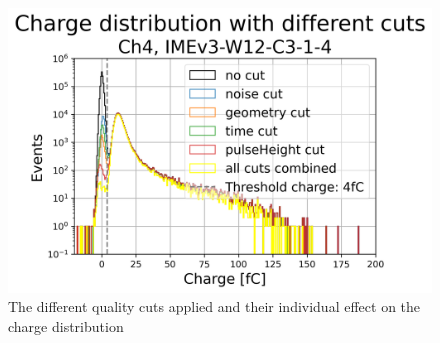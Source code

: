 \begin{figure}[h!tbp]
    \centering
    \includegraphics[width=0.7\linewidth]{Images/appendix/Charge_distribution_different_cuts_batch_401_S1_DUTs_3.png}
    \caption{The different quality cuts applied and their individual effect on the charge distribution}
    \label{fig:charge_plot_all_cuts}
\end{figure}



